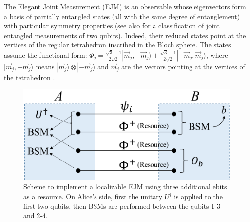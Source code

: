 \documentclass[a4paper,twocolumn,11pt,accepted=2024-02-14]{quantumarticle}
\newcommand{\ket}[1]{| {#1} \rangle} %
\begin{document}
The Elegant Joint Measurement
(EJM) is an observable whose eigenvectors form a basis of partially entangled states (all with the same degree of entanglement) with particular symmetry properties
\cite{gisin2019entanglement} (see also \cite{del2023iso} for a classification of joint entangled measurements of two qubits). Indeed, their reduced states point at the vertices of the regular tetrahedron inscribed in the Bloch sphere. The states assume the functional form: $\Phi_j=\frac{\sqrt{3}+1}{2\sqrt{2}}\ket{\Vec{m}_j,-\Vec{m}_j} +\frac{\sqrt{3}-1}{2\sqrt{2}}\ket{-\Vec{m}_j,\Vec{m}_j}$, where $\ket{\Vec{m}_j,-\Vec{m}_j}$ means $\ket{\Vec{m}_j}\otimes\ket{-\Vec{m}_j}$ and $\Vec{m}_j$ are the vectors pointing at the vertices of the tetrahedron \cite{gisin2019entanglement}. %
 \begin{figure}[ht]
    \centering
    \includegraphics[width=.48\textwidth]{ejm.png}
    \caption{Scheme to implement a localizable EJM using three  additional ebits as a resource. On Alice's side, first the unitary $U^\dagger$ is applied to the first two qubits, then BSMs are performed between the qubits 1-3 and 2-4.}
    \label{fig5}
\end{figure}
\end{document}
